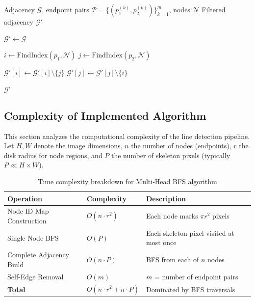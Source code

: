 \begin{algorithm}[H]
\caption{Remove Self-Edges (Same-Object Connections)}
\label{alg:remove_self}
\begin{algorithmic}[1]
\Require Adjacency $\mathcal{G}$, endpoint pairs $\mathcal{P} = \{(p_1^{(k)}, p_2^{(k)})\}_{k=1}^{m}$, nodes $\mathcal{N}$
\Ensure Filtered adjacency $\mathcal{G}'$

\State $\mathcal{G}' \gets \mathcal{G}$

    \State $i \gets \text{FindIndex}(p_1, \mathcal{N})$
    \State $j \gets \text{FindIndex}(p_2, \mathcal{N})$
    
        \State $\mathcal{G}'[i] \gets \mathcal{G}'[i] \setminus \{j\}$
        \State $\mathcal{G}'[j] \gets \mathcal{G}'[j] \setminus \{i\}$
    \EndIf
\EndFor

\State \Return $\mathcal{G}'$
\end{algorithmic}
\end{algorithm}

\subsection{Complexity of Implemented Algorithm}

This section analyzes the computational complexity of the line detection pipeline. Let $H, W$ denote the image dimensions, $n$ the number of nodes (endpoints), $r$ the disk radius for node regions, and $P$ the number of skeleton pixels (typically $P \ll H \times W$).

\begin{table}[H]
\centering
\caption{Time complexity breakdown for Multi-Head BFS algorithm}
\label{tab:time_complexity}
\begin{tabular}{@{}lll@{}}
\toprule
\textbf{Operation} & \textbf{Complexity} & \textbf{Description} \\
\midrule
Node ID Map Construction & $O(n \cdot r^2)$ & Each node marks $\pi r^2$ pixels \\
Single Node BFS & $O(P)$ & Each skeleton pixel visited at most once \\
Complete Adjacency Build & $O(n \cdot P)$ & BFS from each of $n$ nodes \\
Self-Edge Removal & $O(m)$ & $m$ = number of endpoint pairs \\
\midrule
\textbf{Total} & $O(n \cdot r^2 + n \cdot P)$ & Dominated by BFS traversals \\
\bottomrule
\end{tabular}
\end{table}

